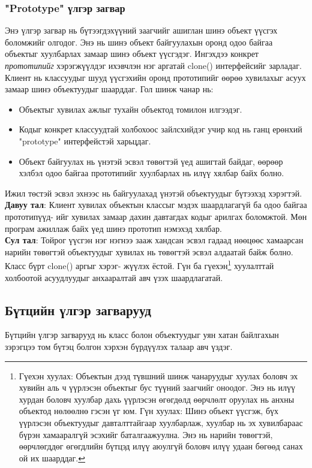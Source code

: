 \subsubsection{"Prototype" үлгэр загвар}
\quad \quad Энэ үлгэр загвар нь бүтээгдэхүүний заагчийг ашиглан шинэ объект үүсгэх боломжийг олгодог. Энэ нь шинэ объект байгуулахын оронд одоо байгаа объектыг хуулбарлах замаар шинэ объект үүсгэдэг. Ингэхдээ конкрет \textit{прототипийг} хэрэгжүүлдэг ихэвчлэн нэг аргатай clone() интерфейсийг зарладаг. Клиент нь классуудыг шууд үүсгэхийн оронд прототипийг өөрөө хувилахыг асуух замаар шинэ объектуудыг шаарддаг. Гол шинж чанар нь:
\begin{itemize}
	\item Объектыг хувилах ажлыг тухайн объектод томилон илгээдэг.
	\item Кодыг конкрет классуудтай холбохоос зайлсхийдэг учир код нь ганц ерөнхий "prototype" интерфейстэй харьцдаг.
	\item Объект байгуулах нь үнэтэй эсвэл төвөгтэй үед ашигтай байдаг, өөрөөр хэлбэл одоо байгаа прототипийг хуулбарлах нь илүү хялбар байх болно.
\end{itemize}
Ижил төстэй эсвэл эхнээс нь байгуулахад үнэтэй объектуудыг бүтээхэд хэрэгтэй.\\
\textbf{Давуу тал}: Клиент хувилах объектын классыг мэдэх шаардлагагүй ба одоо байгаа прототипүүд- ийг хувилах замаар дахин давтагдах кодыг арилгах боломжтой. Мөн програм ажиллаж байх үед шинэ прототип нэмэхэд хялбар.\\
\textbf{Сул тал}: Тойрог үүсгэн нэг нэгнээ зааж хандсан эсвэл гадаад нөөцөөс хамаарсан нарийн төвөгтэй объектуудыг хувилах нь төвөгтэй эсвэл алдаатай байж болно. Класс бүрт  clone()  аргыг хэрэг- жүүлэх ёстой. Гүн ба гүехэн\footnote{
	Гүехэн хуулах: Объектын дээд түвшний шинж чанаруудыг хуулах боловч эх хувийн аль ч үүрлэсэн объектыг бус түүний заагчийг оноодог. Энэ нь илүү хурдан боловч хуулбар дахь үүрлэсэн өгөгдөлд өөрчлөлт оруулах нь анхны объектод нөлөөлнө гэсэн үг юм.
	Гүн хуулах: Шинэ объект үүсгэж, бүх үүрлэсэн объектуудыг давталттайгаар хуулбарлаж, хуулбар нь эх хувилбараас бүрэн хамааралгүй эсэхийг баталгаажуулна. Энэ нь нарийн төвөгтэй, өөрчлөгддөг өгөгдлийн бүтцэд илүү аюулгүй боловч илүү удаан бөгөөд санах ой их шаарддаг.
} хуулалттай холбоотой асуудлуудыг анхааралтай авч үзэх шаардлагатай.

\subsection{Бүтцийн үлгэр загварууд}
Бүтцийн үлгэр загварууд нь класс болон объектуудыг уян хатан байлгахын зэрэгцээ том бүтэц болгон хэрхэн бүрдүүлэх талаар авч үздэг.




